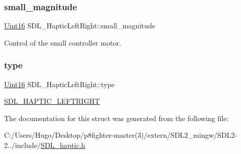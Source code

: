 \subsubsection{\texorpdfstring{small\+\_\+magnitude}{small\_magnitude}}
{\footnotesize\ttfamily \hyperlink{_s_d_l__stdinc_8h_a31fcc0a076c9068668173ee26d33e42b}{Uint16} S\+D\+L\+\_\+\+Haptic\+Left\+Right\+::small\+\_\+magnitude}

Control of the small controller motor. \mbox{\label{struct_s_d_l___haptic_left_right_abef79eeb482a8e623e512f0c9635e1a1}} 
\subsubsection{\texorpdfstring{type}{type}}
{\footnotesize\ttfamily \hyperlink{_s_d_l__stdinc_8h_a31fcc0a076c9068668173ee26d33e42b}{Uint16} S\+D\+L\+\_\+\+Haptic\+Left\+Right\+::type}

\hyperlink{_s_d_l__haptic_8h_ae047624d8458ff6400887c37a36f86d3}{S\+D\+L\+\_\+\+H\+A\+P\+T\+I\+C\+\_\+\+L\+E\+F\+T\+R\+I\+G\+HT} 

The documentation for this struct was generated from the following file\+:\begin{DoxyCompactItemize}
\item 
C\+:/\+Users/\+Hugo/\+Desktop/p8fighter-\/master(3)/extern/\+S\+D\+L2\+\_\+mingw/\+S\+D\+L2-\/2../include/\hyperlink{_s_d_l__haptic_8h}{S\+D\+L\+\_\+haptic.\+h}\end{DoxyCompactItemize}
